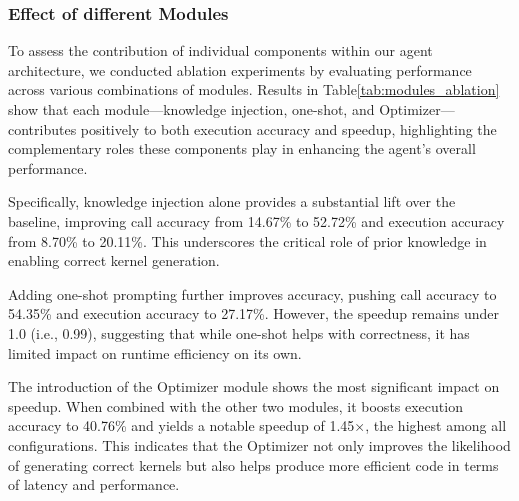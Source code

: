 \subsubsection{Effect of different Modules}
To assess the contribution of individual components within our agent architecture, we conducted ablation experiments by evaluating performance across various combinations of modules.
Results in Table\ref{tab:modules_ablation} show that each module—knowledge injection, one-shot, and Optimizer—contributes positively to both execution accuracy and speedup, highlighting the complementary roles these components play in enhancing the agent's overall performance. 

Specifically, knowledge injection alone provides a substantial lift over the baseline, improving call accuracy from 14.67\% to 52.72\% and execution accuracy from 8.70\% to 20.11\%. This underscores the critical role of prior knowledge in enabling correct kernel generation.

Adding one-shot prompting further improves accuracy, pushing call accuracy to 54.35\% and execution accuracy to 27.17\%. However, the speedup remains under 1.0 (i.e., 0.99), suggesting that while one-shot helps with correctness, it has limited impact on runtime efficiency on its own.

The introduction of the Optimizer module shows the most significant impact on speedup. When combined with the other two modules, it boosts execution accuracy to 40.76\% and yields a notable speedup of 1.45×, the highest among all configurations. This indicates that the Optimizer not only improves the likelihood of generating correct kernels but also helps produce more efficient code in terms of latency and performance.



